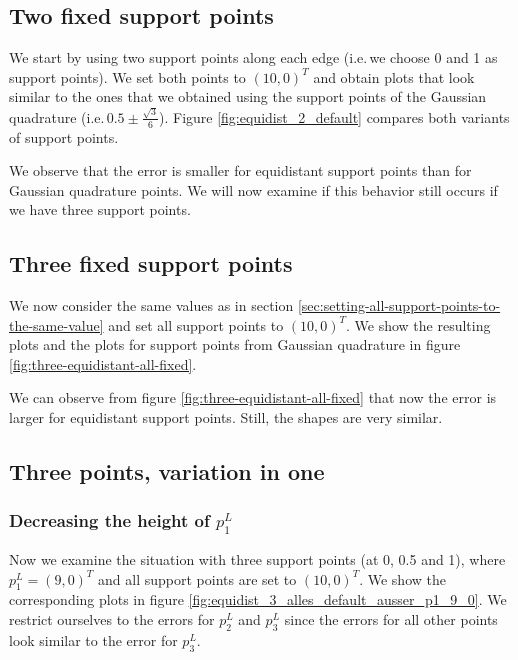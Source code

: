 \documentclass{article}
\begin{document}
\subsection{Two fixed support points}
\label{sec:equidist-two-fixed}

We start by using two support points along each edge (i.e.\,we choose 0 and 1 as support points). We set both points to $(10,0)^T$ and obtain plots that look similar to the ones that we obtained using the support points of the Gaussian quadrature (i.e.\,$0.5\pm\frac{\sqrt 3}{6}$). Figure \ref{fig:equidist_2_default} compares both variants of support points.



We observe that the error is smaller for equidistant support points than for Gaussian quadrature points. We will now examine if this behavior still occurs if we have three support points.

\subsection{Three fixed support points}
\label{sec:equidistant-three-fixed}

We now consider the same values as in section \ref{sec:setting-all-support-points-to-the-same-value} and set all support points to $(10,0)^T$. We show the resulting plots and the plots for support points from Gaussian quadrature in figure \ref{fig:three-equidistant-all-fixed}.



We can observe from figure \ref{fig:three-equidistant-all-fixed} that now the error is larger for equidistant support points. Still, the shapes are very similar.

\subsection{Three points, variation in one}
\label{sec:equidist-3-one-point-variation}

\subsubsection{Decreasing the height of $p_1^L$}
\label{sec:equidist-3-on-point-var-decr-height-p1}

Now we examine the situation with three support points (at 0, 0.5 and 1), where $p_1^L=(9,0)^T$ and all support points are set to $(10,0)^T$. We show the corresponding plots in figure \ref{fig:equidist_3_alles_default_ausser_p1_9_0}. We restrict ourselves to the errors for $p_2^L$ and $p_3^L$ since the errors for all other points look similar to the error for $p_3^L$.
\end{document}
